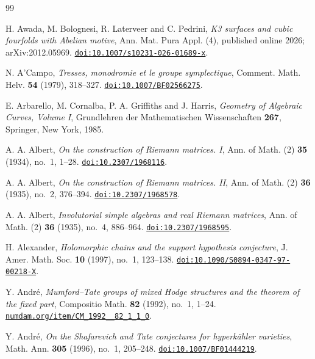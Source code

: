 \begin{thebibliography}{99}

H. Awada, M. Bolognesi, R. Laterveer and C. Pedrini,
\emph{K3 surfaces and cubic fourfolds with Abelian motive},
Ann. Mat. Pura Appl. (4), published online 2026; arXiv:2012.05969.
\href{https://doi.org/10.1007/s10231-026-01689-x}{\texttt{doi:10.1007/s10231-026-01689-x}}.

N. A'Campo,
\emph{Tresses, monodromie et le groupe symplectique},
Comment. Math. Helv. \textbf{54} (1979), 318--327.
\href{https://doi.org/10.1007/BF02566275}{\texttt{doi:10.1007/BF02566275}}.

E. Arbarello, M. Cornalba, P. A. Griffiths and J. Harris,
\emph{Geometry of Algebraic Curves, Volume I},
Grundlehren der Mathematischen Wissenschaften \textbf{267},
Springer, New York, 1985.

A. A. Albert,
\emph{On the construction of Riemann matrices. I},
Ann. of Math. (2) \textbf{35} (1934), no.~1, 1--28.
\href{https://doi.org/10.2307/1968116}{\texttt{doi:10.2307/1968116}}.

A. A. Albert,
\emph{On the construction of Riemann matrices. II},
Ann. of Math. (2) \textbf{36} (1935), no.~2, 376--394.
\href{https://doi.org/10.2307/1968578}{\texttt{doi:10.2307/1968578}}.

A. A. Albert,
\emph{Involutorial simple algebras and real Riemann matrices},
Ann. of Math. (2) \textbf{36} (1935), no.~4, 886--964.
\href{https://doi.org/10.2307/1968595}{\texttt{doi:10.2307/1968595}}.

H. Alexander,
\emph{Holomorphic chains and the support hypothesis conjecture},
J. Amer. Math. Soc. \textbf{10} (1997), no.~1, 123--138.
\href{https://doi.org/10.1090/S0894-0347-97-00218-X}{\texttt{doi:10.1090/S0894-0347-97-00218-X}}.

Y. Andr\'e,
\emph{Mumford--Tate groups of mixed Hodge structures and the theorem of the
fixed part},
Compositio Math. \textbf{82} (1992), no.~1, 1--24.
\href{http://www.numdam.org/item/CM_1992__82_1_1_0/}{\texttt{numdam.org/item/CM\_1992\_\_82\_1\_1\_0}}.

Y. Andr\'e,
\emph{On the Shafarevich and Tate conjectures for hyperk\"ahler varieties},
Math. Ann. \textbf{305} (1996), no.~1, 205--248.
\href{https://doi.org/10.1007/BF01444219}{\texttt{doi:10.1007/BF01444219}}.


\end{thebibliography}
